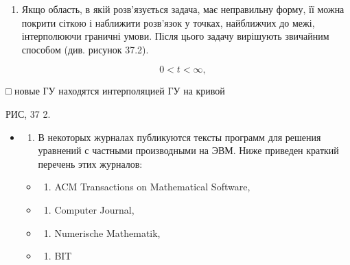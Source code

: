 \documentclass[
  ukrainian,
]{article}
\providecommand{\tightlist}{%
  \setlength{\itemsep}{0pt}\setlength{\parskip}{0pt}}
\begin{document}
\begin{enumerate}
\def\labelenumi{\arabic{enumi}.}
\setcounter{enumi}{5}
\tightlist
\item
  Якщо область, в якій розв'язується задача, має неправильну форму, її
  можна покрити сіткою і наближити розв'язок у точках, найближчих до
  межі, інтерполюючи граничні умови. Після цього задачу вирішують
  звичайним способом (див. рисунок 37.2).
\end{enumerate}

\[
\quad 0 < t < \infty,
\]

□ новые ГУ находятся интерполяцией ГУ на кривой

РИС, 37 2.

\begin{itemize}
\item
  \begin{enumerate}
  \def\labelenumi{\arabic{enumi}.}
  \setcounter{enumi}{6}
  \tightlist
  \item
    В некоторых журналах публикуются тексты программ для решения
    уравнений с частными производными на ЭВМ. Ниже приведен краткий
    перечень этих журналов:
  \end{enumerate}

  \begin{itemize}
  \tightlist
  \item
    \begin{enumerate}
    \def\labelenumi{\alph{enumi})}
    \tightlist
    \item
      ACM Transactions on Mathematical Software,
    \end{enumerate}
  \item
    \begin{enumerate}
    \def\labelenumi{\arabic{enumi})}
    \setcounter{enumi}{5}
    \tightlist
    \item
      Computer Journal,
    \end{enumerate}
  \item
    \begin{enumerate}
    \def\labelenumi{\Alph{enumi})}
    \setcounter{enumi}{1}
    \tightlist
    \item
      Numerische Mathematik,
    \end{enumerate}
  \item
    \begin{enumerate}
    \def\labelenumi{\alph{enumi})}
    \setcounter{enumi}{17}
    \tightlist
    \item
      BIT
    \end{enumerate}
  \end{itemize}
\end{itemize}
\end{document}
